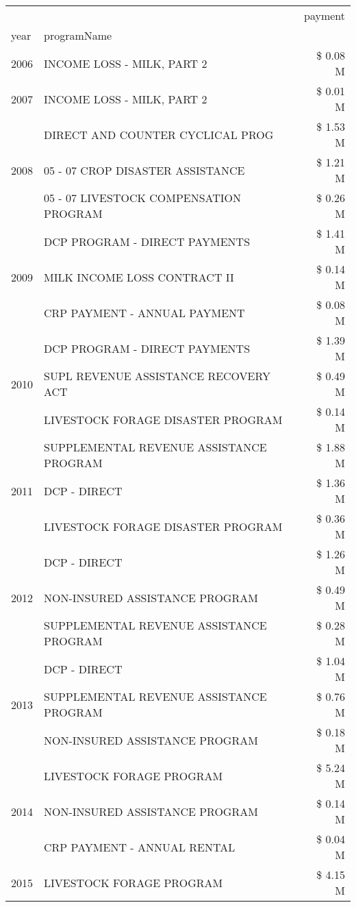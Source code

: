 \begin{tabular}{llr}
\toprule
 &  & payment \\
year & programName &  \\
\midrule
2006 & INCOME LOSS - MILK, PART 2 & \$ 0.08 M \\
\cline{1-3}
2007 & INCOME LOSS - MILK, PART 2 & \$ 0.01 M \\
\cline{1-3}
\multirow[t]{3}{*}{2008} & DIRECT AND COUNTER CYCLICAL PROG & \$ 1.53 M \\
 & 05 - 07 CROP DISASTER ASSISTANCE & \$ 1.21 M \\
 & 05 - 07 LIVESTOCK COMPENSATION PROGRAM & \$ 0.26 M \\
\cline{1-3}
\multirow[t]{3}{*}{2009} & DCP PROGRAM - DIRECT PAYMENTS & \$ 1.41 M \\
 & MILK INCOME LOSS CONTRACT II & \$ 0.14 M \\
 & CRP PAYMENT - ANNUAL PAYMENT & \$ 0.08 M \\
\cline{1-3}
\multirow[t]{3}{*}{2010} & DCP PROGRAM - DIRECT PAYMENTS & \$ 1.39 M \\
 & SUPL REVENUE ASSISTANCE RECOVERY ACT & \$ 0.49 M \\
 & LIVESTOCK FORAGE DISASTER  PROGRAM & \$ 0.14 M \\
\cline{1-3}
\multirow[t]{3}{*}{2011} & SUPPLEMENTAL REVENUE ASSISTANCE PROGRAM & \$ 1.88 M \\
 & DCP - DIRECT & \$ 1.36 M \\
 & LIVESTOCK FORAGE DISASTER PROGRAM & \$ 0.36 M \\
\cline{1-3}
\multirow[t]{3}{*}{2012} & DCP - DIRECT & \$ 1.26 M \\
 & NON-INSURED ASSISTANCE PROGRAM & \$ 0.49 M \\
 & SUPPLEMENTAL REVENUE ASSISTANCE PROGRAM & \$ 0.28 M \\
\cline{1-3}
\multirow[t]{3}{*}{2013} & DCP - DIRECT & \$ 1.04 M \\
 & SUPPLEMENTAL REVENUE ASSISTANCE PROGRAM & \$ 0.76 M \\
 & NON-INSURED ASSISTANCE PROGRAM & \$ 0.18 M \\
\cline{1-3}
\multirow[t]{3}{*}{2014} & LIVESTOCK FORAGE PROGRAM & \$ 5.24 M \\
 & NON-INSURED ASSISTANCE PROGRAM & \$ 0.14 M \\
 & CRP PAYMENT - ANNUAL RENTAL & \$ 0.04 M \\
\cline{1-3}
\multirow[t]{3}{*}{2015} & LIVESTOCK FORAGE PROGRAM & \$ 4.15 M \\

\end{tabular}
